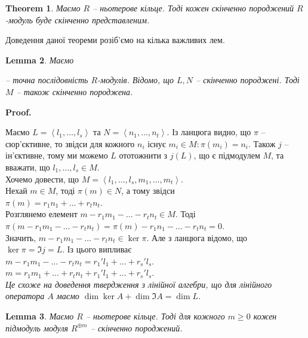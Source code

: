 \documentclass[a4paper, 10pt]{article}
\makeatletter
\theoremstyle{theoremdd}
\newtheorem{theorem}{Theorem}[subsection]
\theoremstyle{theoremdd}
\theoremstyle{theoremdd}
\theoremstyle{theoremdd}
\theoremstyle{theoremdd}
\theoremstyle{theoremdd}
\theoremstyle{theoremdd}
\theoremstyle{theoremdd}
\theoremstyle{theoremdd}
\theoremstyle{theoremdd}
\theoremstyle{theoremdd}
\theoremstyle{theoremdd}
\theoremstyle{theoremdd}
\newtheorem{lemma}[theorem]{Lemma}
\theoremstyle{theoremdd}
\theoremstyle{theoremdd}
\renewenvironment{proof}[1][Proof.\\]{\par
\pushQED{\hfill \qed}%
\normalfont \topsep6\p@\@plus6\p@\relax
\trivlist
\item\relax
{\bfseries
#1\@addpunct{.}}\hspace\labelsep\ignorespaces
}{%
\popQED\endtrivlist\@endpefalse
}
\makeatother
\begin{document}
\begin{theorem}
Маємо $R$ -- ньотерове кільце. Тоді кожен скінченно породжений $R$-модуль буде скінченно представленим.
\end{theorem}

Доведення даної теореми розіб'ємо на кілька важливих лем.

\begin{lemma}
Маємо  -- точна послідовність $R$-модулів. Відомо, що $L,N$ -- скінченно породжені. Тоді $M$ -- також скінченно породжена.
\end{lemma}

\begin{proof}
Маємо $L = \left< l_1,\dots,l_s \right>$ та $N = \left< n_1,\dots,n_t\right>$. Із ланцюга видно, що $\pi$ -- сюр'єктивне, то звідси для кожного $n_i$ існує $m_i \in M: \pi(m_i) = n_i$. Також $j$ -- ін'єктивне, тому ми можемо $L$ ототожнити з $j(L)$, що є підмодулем $M$, та вважати, що $l_1,\dots,l_s \in M$.\\ Хочемо довести, що $M = \left< l_1,\dots,l_s,m_1,\dots,m_t \right>$.\\
Нехай $m \in M$, тоді $\pi(m) \in N$, а тому звідси\\
$\pi(m) = r_1 n_1 + \dots + r_t n_t$.\\
Розглянемо елемент $m - r_1m_1 - \dots - r_t n_t \in M$. Тоді\\
$\pi(m - r_1m_1 - \dots - r_t n_t ) = \pi(m) - r_1 n_1 - \dots - r_t n_t = 0$.\\
Значить, $m - r_1m_1 - \dots - r_t n_t \in \ker \pi$. Але з ланцюга відомо, що $\ker \pi = \Im j = L$. Із цього випливає\\
$m - r_1m_1 - \dots - r_t n_t = r_1'l_1 + \dots + r_s' l_s$.\\
$m =  r_1m_1 + \dots + r_t n_t + r_1'l_1 + \dots + r_s' l_s$.\\
\textit{Це схоже на доведення твердження з лінійної алгебри, що для лінійного оператора $A$ маємо $\dim \ker A + \dim \Im A = \dim L$.}
\end{proof}

\begin{lemma}
Маємо $R$ -- ньотерове кільце. Тоді для кожного $m \geq 0$ кожен підмодуль модуля $R^{\oplus m}$ -- скінченно породжений.
\end{lemma}
\end{document}
